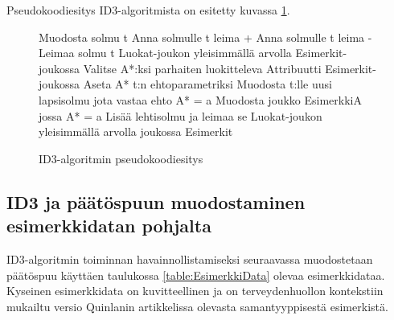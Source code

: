 \documentclass[12pt,finnish]{tktltiki2}
\theoremstyle{definition}
\theoremstyle{remark}
\begin{document}
Pseudokoodiesitys ID3-algoritmista on esitetty kuvassa \ref{fig:pseudokoodi}.


\begin{figure}
\begin{algorithmic}
\State Muodosta solmu t
    \State Anna solmulle t leima +
    \State{}
\EndIf
{}
    \State Anna solmulle t leima -
    \State{}
\EndIf
\State Leimaa solmu t Luokat-joukon yleisimmällä arvolla Esimerkit-joukossa  
    \State{}
\EndIf    
\State Valitse {A*}:ksi {parhaiten luokitteleva Attribuutti Esimerkit-joukossa}
\State Aseta A* t:n ehtoparametriksi
    \State Muodosta t:lle uusi lapsisolmu jota vastaa ehto A* = a
    \State Muodosta joukko EsimerkkiA jossa A* = a
        \State Lisää lehtisolmu ja leimaa se Luokat-joukon yleisimmällä arvolla joukossa Esimerkit
    \Else
    \EndIf
\EndFor
\State{}
\EndFunction
\end{algorithmic}
\caption{ID3-algoritmin pseudokoodiesitys}
\label{fig:pseudokoodi}
\end{figure}


\subsection{ID3 ja päätöspuun muodostaminen esimerkkidatan pohjalta}
\label{sec:ID3esimerkki}

ID3-algoritmin toiminnan havainnollistamiseksi seuraavassa muodostetaan päätöspuu käyttäen taulukossa \ref{table:EsimerkkiData} olevaa esimerkkidataa.
Kyseinen esimerkkidata on kuvitteellinen ja on terveydenhuollon kontekstiin mukailtu versio Quinlanin artikkelissa
\cite{quinlan} olevasta samantyyppisestä esimerkistä.
\end{document}
